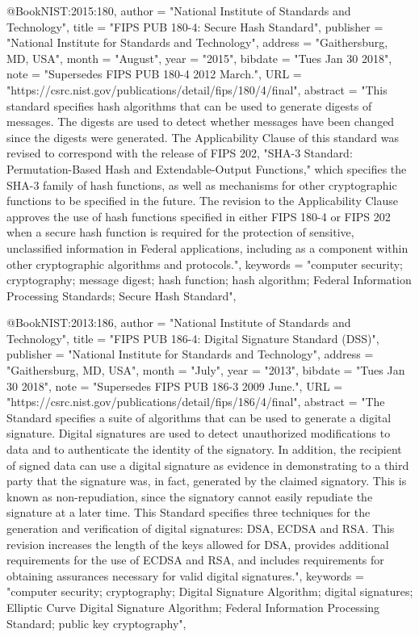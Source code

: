 @Book{NIST:2015:180,
  author =       "{National Institute of Standards and Technology}",
  title =        "{FIPS PUB 180-4}: Secure Hash Standard",
  publisher =    "National Institute for Standards and Technology",
  address =      "Gaithersburg, MD, USA",
  month =        "August",
  year =         "2015",
  bibdate =      "Tues Jan 30 2018",
  note =         "Supersedes FIPS PUB 180-4 2012 March.",
  URL =          "https://csrc.nist.gov/publications/detail/fips/180/4/final",
  abstract =     "This standard specifies hash algorithms that can be used to generate digests of messages. The digests are used to detect whether messages have been changed since the digests were generated. The Applicability Clause of this standard was revised to correspond with the release of FIPS 202, "SHA-3 Standard: Permutation-Based Hash and Extendable-Output Functions," which specifies the SHA-3 family of hash functions, as well as mechanisms for other cryptographic functions to be specified in the future. The revision to the Applicability Clause approves the use of hash functions specified in either FIPS 180-4 or FIPS 202 when a secure hash function is required for the protection of sensitive, unclassified information in Federal applications, including as a component within other cryptographic algorithms and protocols.",
  keywords =     "computer security; cryptography; message digest; hash function; hash algorithm; Federal Information Processing Standards; Secure Hash Standard",
}

@Book{NIST:2013:186,
  author =       "{National Institute of Standards and Technology}",
  title =        "{FIPS PUB 186-4}: Digital Signature Standard (DSS)",
  publisher =    "National Institute for Standards and Technology",
  address =      "Gaithersburg, MD, USA",
  month =        "July",
  year =         "2013",
  bibdate =      "Tues Jan 30 2018",
  note =         "Supersedes FIPS PUB 186-3 2009 June.",
  URL =          "https://csrc.nist.gov/publications/detail/fips/186/4/final",
  abstract =     "The Standard specifies a suite of algorithms that can be used to generate a digital signature. Digital signatures are used to detect unauthorized modifications to data and to authenticate the identity of the signatory. In addition, the recipient of signed data can use a digital signature as evidence in demonstrating to a third party that the signature was, in fact, generated by the claimed signatory. This is known as non-repudiation, since the signatory cannot easily repudiate the signature at a later time. This Standard specifies three techniques for the generation and verification of digital signatures: DSA, ECDSA and RSA. This revision increases the length of the keys allowed for DSA, provides additional requirements for the use of ECDSA and RSA, and includes requirements for obtaining assurances necessary for valid digital signatures.",
  keywords =     "computer security; cryptography; Digital Signature Algorithm; digital signatures; Elliptic Curve Digital Signature Algorithm; Federal Information Processing Standard; public key cryptography",
}
  

